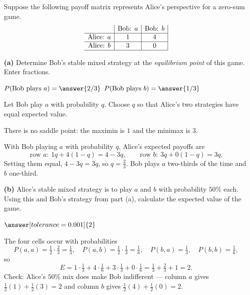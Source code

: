 \documentclass[12pt]{ximera}
\begin{document}
\begin{problem}
Suppose the following payoff matrix represents Alice's perspective for a zero-sum game.
\[
\begin{array}{c|c|c|}
\phantom{|} & \text{Bob: }a & \text{Bob: }b \\\hline
\text{Alice: }a & 1 & 4 \\\hline
\text{Alice: }b & 3 & 0 \\\hline
\end{array}
\]

\begin{prompt}
\textbf{(a)} Determine Bob's stable mixed strategy at the \emph{equilibrium point} of
this game. Enter fractions.

$P(\text{Bob plays } a)=\answer{2/3}$ \qquad $P(\text{Bob plays } b)=\answer{1/3}$

\begin{hint}
Let Bob play $a$ with probability $q$. Choose $q$ so that Alice's two strategies have
equal expected value.
\end{hint}

\begin{feedback}
There is no saddle point: the maximin is $1$ and the minimax is $3$.

With Bob playing $a$ with probability $q$, Alice's expected payoffs are
\[
\text{row } a:\ 1q+4(1-q)=4-3q, \qquad \text{row } b:\ 3q+0(1-q)=3q.
\]
Setting them equal, $4-3q=3q$, so $q=\frac23$. Bob plays $a$ two-thirds of the time
and $b$ one-third.
\end{feedback}
\end{prompt}

\begin{prompt}
\textbf{(b)} Alice's stable mixed strategy is to play $a$ and $b$ with probability
$50\%$ each. Using this and Bob's strategy from part (a), calculate the expected value
of the game.

$\answer[tolerance=0.001]{2}$

\begin{feedback}
The four cells occur with probabilities
\[
P(a,a)=\tfrac12\cdot\tfrac23=\tfrac13,\quad P(a,b)=\tfrac12\cdot\tfrac13=\tfrac16,\quad
P(b,a)=\tfrac13,\quad P(b,b)=\tfrac16,
\]
so
\[
E=1\cdot\tfrac13+4\cdot\tfrac16+3\cdot\tfrac13+0\cdot\tfrac16=\tfrac13+\tfrac23+1=2.
\]
Check: Alice's $50\%$ mix does make Bob indifferent --- column $a$ gives
$\frac12(1)+\frac12(3)=2$ and column $b$ gives $\frac12(4)+\frac12(0)=2$.
\end{feedback}
\end{prompt}
\end{problem}
\end{document}
